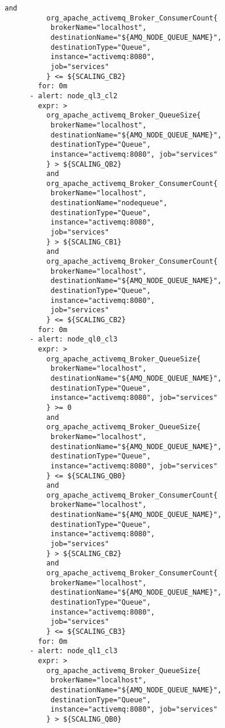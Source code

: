 \begin{lstlisting}[style=bashStyle,caption={alert-unparsed.yml},label=lst:alert-unparsed]
          and
          org_apache_activemq_Broker_ConsumerCount{
           brokerName="localhost",
           destinationName="${AMQ_NODE_QUEUE_NAME}", 
           destinationType="Queue",
           instance="activemq:8080", 
           job="services"
          } <= ${SCALING_CB2}
        for: 0m
      - alert: node_ql3_cl2
        expr: >
          org_apache_activemq_Broker_QueueSize{
           brokerName="localhost", 
           destinationName="${AMQ_NODE_QUEUE_NAME}",
           destinationType="Queue", 
           instance="activemq:8080", job="services"
          } > ${SCALING_QB2}
          and 
          org_apache_activemq_Broker_ConsumerCount{
           brokerName="localhost",
           destinationName="nodequeue", 
           destinationType="Queue",
           instance="activemq:8080", 
           job="services"
          } > ${SCALING_CB1}
          and
          org_apache_activemq_Broker_ConsumerCount{
           brokerName="localhost",
           destinationName="${AMQ_NODE_QUEUE_NAME}", 
           destinationType="Queue",
           instance="activemq:8080", 
           job="services"
          } <= ${SCALING_CB2}
        for: 0m
      - alert: node_ql0_cl3
        expr: >
          org_apache_activemq_Broker_QueueSize{
           brokerName="localhost", 
           destinationName="${AMQ_NODE_QUEUE_NAME}",
           destinationType="Queue", 
           instance="activemq:8080", job="services"
          } >= 0
          and 
          org_apache_activemq_Broker_QueueSize{
           brokerName="localhost", 
           destinationName="${AMQ_NODE_QUEUE_NAME}",
           destinationType="Queue", 
           instance="activemq:8080", job="services"
          } <= ${SCALING_QB0}
          and 
          org_apache_activemq_Broker_ConsumerCount{
           brokerName="localhost",
           destinationName="${AMQ_NODE_QUEUE_NAME}", 
           destinationType="Queue",
           instance="activemq:8080", 
           job="services"
          } > ${SCALING_CB2}
          and
          org_apache_activemq_Broker_ConsumerCount{
           brokerName="localhost",
           destinationName="${AMQ_NODE_QUEUE_NAME}", 
           destinationType="Queue",
           instance="activemq:8080", 
           job="services"
          } <= ${SCALING_CB3}
        for: 0m
      - alert: node_ql1_cl3
        expr: >
          org_apache_activemq_Broker_QueueSize{
           brokerName="localhost", 
           destinationName="${AMQ_NODE_QUEUE_NAME}",
           destinationType="Queue", 
           instance="activemq:8080", job="services"
          } > ${SCALING_QB0}

\end{lstlisting}
